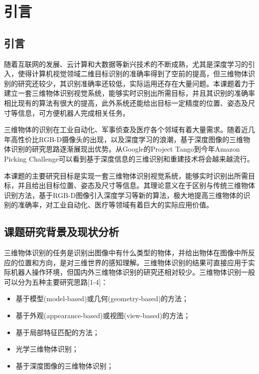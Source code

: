 \chapter{引言}
\label{chap:introduction}
\section{引言}
随着互联网的发展、云计算和大数据等新兴技术的不断成熟，尤其是深度学习的引入，使得计算机视觉领域二维目标识别的准确率得到了空前的提高，但三维物体识别的研究还较少，其识别准确率还较低，实际运用还存在大量问题。本课题着力于建立一套三维物体识别视觉系统，能够实时识别出所需目标，并且其识别的准确率相比现有的算法有很大的提高，此外系统还能给出目标一定精度的位置、姿态及尺寸等信息，可方便机器人完成相关任务。

三维物体的识别在工业自动化、军事侦查及医疗各个邻域有着大量需求。随着近几年高性价比RGB-D摄像头的出现，以及深度学习的浪潮，基于深度图像的三维物体识别的研究思路逐渐展现出优势。从Google的Project Tango到今年Amazon Picking Challenge可以看到基于深度信息的三维识别和重建技术将会越来越流行。

本课题的主要研究目标是实现一套三维物体识别视觉系统，能够实时识别出所需目标，并且给出目标位置、姿态及尺寸等信息。其理论意义在于区别与传统三维物体识别方法，基于RGB-D图像引入深度学习等新的算法，极大地提高三维物体的识别的准确率，对工业自动化、医疗等领域有着巨大的实际应用价值。

\section{课题研究背景及现状分析}
三维物体识别的任务是识别出图像中有什么类型的物体，并给出物体在图像中所反应的位置和方向，是对三维世界的感知理解。三维物体识别的结果可直接应用于实际机器人操作环境，但国内外三维物体识别的研究还相对较少。三维物体识别一般可以分为五种主要研究思路[1-4]：
\begin{itemize}
\item 基于模型(model-based)或几何(geometry-based)的方法；
\item 基于外观(appearance-based)或视图(view-based)的方法；
\item 基于局部特征匹配的方法； 
\item 光学三维物体识别； 
\item 基于深度图像的三维物体识别；
\end{itemize}

